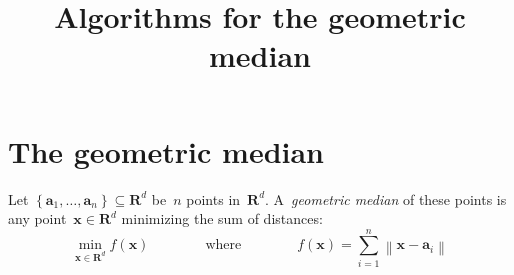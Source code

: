 
\newcommand{\ud}{\mathrm{d}}
\newcommand{\R}{\mathbf{R}}
\newcommand{\x}{\mathbf{x}}
\newcommand{\y}{\mathbf{y}}
\newcommand{\p}{\mathbf{p}}
\newcommand{\1}{\mathbf{1}}

\newcommand{\R}{\mathbf{R}}
\newcommand{\C}{\mathbf{C}}
\newcommand{\N}{\mathbf{N}}
\newcommand{\T}{\mathbf{T}}
\newcommand{\x}{\mathbf{x}}
\newcommand{\a}{\mathbf{a}}
\newcommand{\y}{\mathbf{y}}
\newcommand{\m}{\mathbf{m}}
\newcommand{\b}{\mathbf{b}}
\newcommand{\u}{\mathbf{u}}
\newcommand{\Z}{\mathbf{Z}}
\newcommand{\F}{\mathcal{F}}

\newcommand{\med}[0]{\mathrm{med}}
\newcommand{\reference}[1] {{\scriptsize \color{gray}{#1}}}
\newcommand{\referenceq}[1] {{\tiny \color{gray}[{#1}]}}
\newcommand{\referencep}[1] {{\tiny \color{gray}  #1 }}
\newcommand{\unit}[1] {{\tiny \color{gray}  #1 }}

\newcommand{\parens}[1]{\left(#1\right)} %
\newcommand{\pairing}[2]{\left\langle #1,\,#2\right\rangle} %


\newcommand{\abs}[1]{\left|#1\right|}
\newcommand{\Abs}[1]{\left\|#1\right\|}
\newcommand{\ABS}[1]{{\left\vert\kern-0.25ex\left\vert\kern-0.25ex\left\vert #1 \right\vert\kern-0.25ex\right\vert\kern-0.25ex\right\vert}}



\title{Algorithms for the geometric median}


\section{The geometric median}

\begin{definition}
Let
\(
	\left\{\a_1,\ldots,\a_n\right\}\subseteq\R^d
\)
be~$n$ points in~$\R^d$.
A~\emph{geometric median} of these points is any point~$\x\in\R^d$ minimizing
the sum of distances:
\begin{equation}\label{eq:objective}
	\min_{\x\in\R^d} f(\x)
	\qquad
	\qquad
	\textrm{where}
	\qquad
	\qquad
	f(\x) = \sum_{i=1}^n \left\|\x-\a_i\right\|
\end{equation}
\end{definition}

